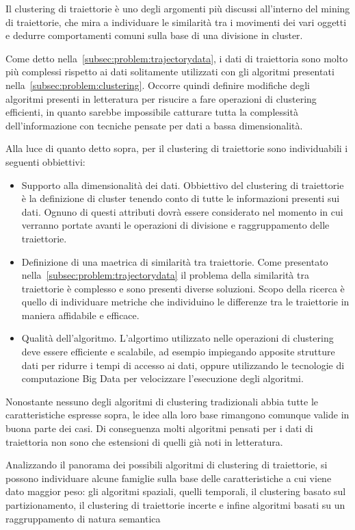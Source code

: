 Il clustering di traiettorie è uno degli argomenti più discussi all'interno del mining di traiettorie, che mira
a individuare le similarità tra i movimenti dei vari oggetti e dedurre comportamenti comuni sulla
base di una divisione in cluster.

Come detto nella~\cref*{subsec:problem:trajectorydata}, i dati di traiettoria sono molto più complessi
rispetto ai dati solitamente utilizzati con gli algoritmi presentati nella~\cref*{subsec:problem:clustering}.
Occorre quindi definire modifiche degli algoritmi presenti in letteratura per risucire a fare operazioni di clustering
efficienti, in quanto sarebbe impossibile catturare tutta la complessità dell'informazione con
tecniche pensate per dati a bassa dimensionalità.

Alla luce di quanto detto sopra, per il clustering di traiettorie sono individuabili i seguenti obbiettivi:

\begin{itemize}

  \item Supporto alla dimensionalità dei dati.
  Obbiettivo del clustering di traiettorie è la definizione di cluster tenendo conto di tutte le informazioni presenti sui dati.
  Ognuno di questi attributi dovrà essere considerato nel momento in cui verranno portate avanti le operazioni di divisione e raggruppamento delle traiettorie.

  \item Definizione di una maetrica di similarità tra traiettorie.
  Come presentato nella~\cref{subsec:problem:trajectorydata} il problema della similarità tra traiettorie è complesso e sono presenti diverse soluzioni.
  Scopo della ricerca è quello di individuare metriche che individuino le differenze tra le traiettorie in maniera affidabile e efficace.

  \item Qualità dell'algoritmo.
  L'algortimo utilizzato nelle operazioni di clustering deve essere efficiente e scalabile, ad esempio impiegando apposite strutture dati per
  ridurre i tempi di accesso ai dati, oppure utilizzando le tecnologie di computazione Big Data per velocizzare l'esecuzione degli algoritmi.

\end{itemize}

Nonostante nessuno degli algoritmi di clustering tradizionali abbia tutte le caratteristiche espresse sopra, le idee alla loro base rimangono comunque
valide in buona parte dei casi.
Di conseguenza molti algoritmi pensati per i dati di traiettoria non sono che estensioni di quelli già noti in letteratura.

Analizzando il panorama dei possibili algoritmi di clustering di traiettorie, si possono individuare alcune famiglie sulla base delle caratteristiche a cui
viene dato maggior peso: gli algoritmi spaziali, quelli temporali, il clustering basato sul partizionamento, il clustering di traiettorie incerte e infine algoritmi
basati su un raggruppamento di natura semantica
